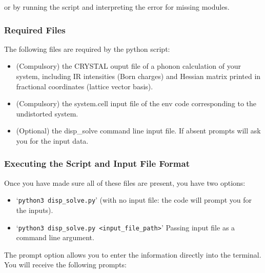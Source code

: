or by running the script and interpreting the error for missing modules.

\subsubsection{Required Files}
The following files are required by the python script:
\begin{itemize}  
  \item (Compulsory) the CRYSTAL ouput file of a phonon calculation of your system, including IR intensities (Born charges) and Hessian matrix printed in fractional coordinates (lattice vector basis).
  \item (Compulsory) the system.cell input file of the env code corresponding to the undistorted system.
  \item (Optional) the disp\_solve command line input file. If absent prompts will ask you for the input data.  
\end{itemize}

\subsubsection{Executing the Script and Input File Format}
Once you have made sure all of these files are present, you have two options: 
\begin{itemize}
	\item `\texttt{python3 disp\_solve.py}' (with no input file: the code will prompt you for the inputs).
	\item `\texttt{python3 disp\_solve.py <input\_file\_path>}' Passing input file as a command line argument.
\end{itemize}

The prompt option allows you to enter the information directly into the terminal. You will receive the following prompts:

